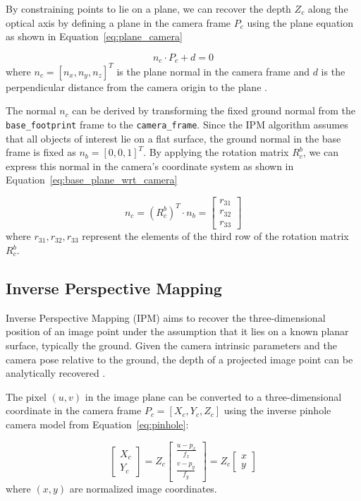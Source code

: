 \documentclass[journal]{IAENGtran}
\begin{document}
By constraining points to lie on a plane, we can recover the depth $Z_c$ along the optical axis
by defining a plane in the camera frame $P_c$ using the plane equation as shown in Equation~\ref{eq:plane_camera}

\begin{equation} \label{eq:plane_camera}
n_c \cdot P_c + d = 0
\end{equation}
where $n_c = [n_x, n_y, n_z]^T$ is the plane normal in the camera frame and $d$
is the perpendicular distance from the camera origin to the plane \cite{Stewart2012}.

The normal $n_c$ can be derived by transforming the fixed ground normal from the \texttt{base\_footprint}
frame to the \texttt{camera\_frame}. Since the IPM algorithm assumes that all objects of interest
lie on a flat surface, the ground normal in the base frame is fixed as $n_b = [0, 0, 1]^T$.
By applying the rotation matrix $R_{c}^{b}$, we can express this
normal in the camera's coordinate system as shown in Equation~\ref{eq:base_plane_wrt_camera}

\begin{equation} \label{eq:base_plane_wrt_camera}
n_c = (R_{c}^{b})^{T} \cdot n_b = \begin{bmatrix} r_{31} \\ r_{32} \\ r_{33} \end{bmatrix}
\end{equation}
where $r_{31}, r_{32}, r_{33}$ represent the elements of the third row of the rotation matrix $R_{c}^{b}$.

\subsection{Inverse Perspective Mapping}
Inverse Perspective Mapping (IPM) aims to recover the three-dimensional
position of an image point under the assumption that it lies on a known
planar surface, typically the ground. Given the camera intrinsic parameters
and the camera pose relative to the ground, the depth of a projected image
point can be analytically recovered \cite{Bertozzi1998,Park2023}.

The pixel $(u, v)$ in the image plane can be converted to a three-dimensional coordinate in
the camera frame $P_c = [X_c, Y_c, Z_c]$ using the inverse pinhole camera model
from Equation~\ref{eq:pinhole}:

\begin{equation} \label{eq:coordinate_camera}
\begin{bmatrix} X_c \\ Y_c \end{bmatrix} = Z_c
\begin{bmatrix} \frac{u - p_x}{f_x} \\ \frac{v - p_y}{f_y} \end{bmatrix} = Z_c
\begin{bmatrix} x \\ y \end{bmatrix}
\end{equation}
where $(x, y)$ are normalized image coordinates.
\end{document}
